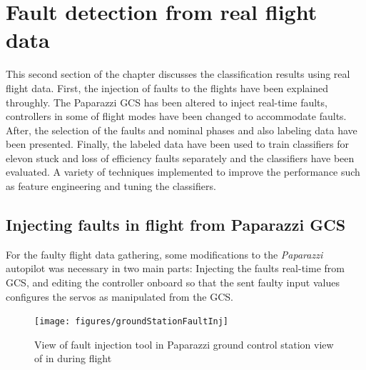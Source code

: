 


\section{Fault detection from real flight data}

This second section of the chapter discusses the classification results using real flight data. First, the injection of faults to the flights have been explained throughly. The Paparazzi GCS has been altered to inject real-time faults, controllers in some of flight modes have been changed to accommodate faults. After, the selection of the faults and nominal phases and also labeling data have been presented. Finally, the labeled data have been used to train classifiers for elevon stuck and loss of efficiency faults separately and the classifiers have been evaluated. A variety of techniques implemented to improve the performance such as feature engineering and tuning the classifiers. 

\subsection{Injecting faults in flight from Paparazzi GCS}

For the faulty flight data gathering, some modifications to the \emph{Paparazzi} autopilot was necessary in two main parts: Injecting the faults real-time from GCS, and editing the controller onboard so that the sent faulty input values configures the servos as manipulated from the GCS. 

\begin{figure}
\begin{center}
\texttt{[image: figures/groundStationFaultInj]}    %
\caption{View of fault injection tool in Paparazzi ground control station view of in during flight} 
\label{fig:groundStationFaultInj}
\end{center}
\end{figure}

